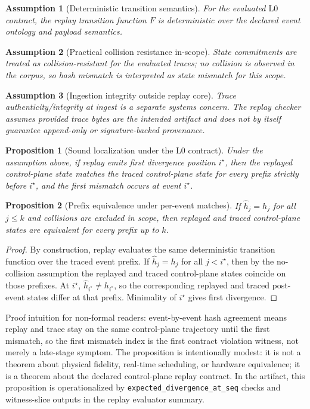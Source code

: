 \documentclass[11pt]{article}
\newcommand{\field}[1]{\texttt{#1}}
\newcommand{\Lzero}{\ensuremath{\mathrm{L0}}}
\newtheorem{proposition}{Proposition}
\newtheorem{assumption}{Assumption}
\begin{document}
\begin{assumption}[Deterministic transition semantics]
For the evaluated \Lzero{} contract, the replay transition function $F$ is deterministic over the declared event ontology and payload semantics.
\end{assumption}

\begin{assumption}[Practical collision resistance in-scope]
State commitments are treated as collision-resistant for the evaluated traces; no collision is observed in the corpus, so hash mismatch is interpreted as state mismatch for this scope.
\end{assumption}

\begin{assumption}[Ingestion integrity outside replay core]
Trace authenticity/integrity at ingest is a separate systems concern. The replay checker assumes provided trace bytes are the intended artifact and does not by itself guarantee append-only or signature-backed provenance.
\end{assumption}

\begin{proposition}[Sound localization under the \Lzero{} contract]
Under the assumption above, if replay emits first divergence position $i^\star$, then the replayed control-plane state matches the traced control-plane state for every prefix strictly before $i^\star$, and the first mismatch occurs at event $i^\star$.
\end{proposition}

\begin{proposition}[Prefix equivalence under per-event matches]
If $\hat{h}_j = h_j$ for all $j \le k$ and collisions are excluded in scope, then replayed and traced control-plane states are equivalent for every prefix up to $k$.
\end{proposition}

\begin{proof}
By construction, replay evaluates the same deterministic transition function over the traced event prefix. If $\hat{h}_j = h_j$ for all $j < i^\star$, then by the no-collision assumption the replayed and traced control-plane states coincide on those prefixes. At $i^\star$, $\hat{h}_{i^\star} \neq h_{i^\star}$, so the corresponding replayed and traced post-event states differ at that prefix. Minimality of $i^\star$ gives first divergence.
\end{proof}

Proof intuition for non-formal readers: event-by-event hash agreement means replay and trace stay on the same control-plane trajectory until the first mismatch, so the first mismatch index is the first contract violation witness, not merely a late-stage symptom.
The proposition is intentionally modest: it is not a theorem about physical fidelity, real-time scheduling, or hardware equivalence; it is a theorem about the declared control-plane replay contract.
In the artifact, this proposition is operationalized by \field{expected\_divergence\_at\_seq} checks and witness-slice outputs in the replay evaluator summary.
\end{document}
